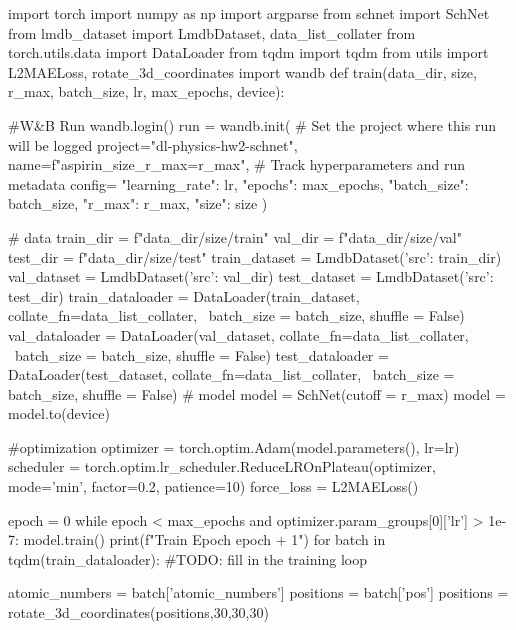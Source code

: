 import torch
import numpy as np
import argparse
from schnet import SchNet
from lmdb_dataset import LmdbDataset, data_list_collater
from torch.utils.data import DataLoader
from tqdm import tqdm
from utils import L2MAELoss, rotate_3d_coordinates
import wandb
def train(data_dir, size, r_max, batch_size, lr, max_epochs, device):

    #W&B Run
    wandb.login()
    run = wandb.init(
    # Set the project where this run will be logged
    project="dl-physics-hw2-schnet",
    name=f"aspirin_{size}_r_max={r_max}",
    # Track hyperparameters and run metadata
    config={
        "learning_rate": lr,
        "epochs": max_epochs,
        "batch_size": batch_size,
        "r_max": r_max,
        "size": size
    }
    )

    # data
    train_dir = f"{data_dir}/{size}/train"
    val_dir = f"{data_dir}/{size}/val"
    test_dir = f"{data_dir}/{size}/test"
    train_dataset = LmdbDataset({'src': train_dir})
    val_dataset = LmdbDataset({'src': val_dir})
    test_dataset = LmdbDataset({'src': test_dir})
    train_dataloader = DataLoader(train_dataset, collate_fn=data_list_collater, \
                                batch_size = batch_size, shuffle = False)
    val_dataloader = DataLoader(val_dataset, collate_fn=data_list_collater, \
                                batch_size = batch_size, shuffle = False)
    test_dataloader = DataLoader(test_dataset, collate_fn=data_list_collater, \
                                batch_size = batch_size, shuffle = False)
    # model
    model = SchNet(cutoff = r_max)
    model = model.to(device)

    #optimization
    optimizer = torch.optim.Adam(model.parameters(), lr=lr)
    scheduler = torch.optim.lr_scheduler.ReduceLROnPlateau(optimizer, mode='min', factor=0.2, patience=10)    
    force_loss = L2MAELoss()

    epoch = 0
    while epoch < max_epochs and optimizer.param_groups[0]['lr'] > 1e-7:
        model.train()
        print(f"Train Epoch {epoch + 1}")
        for batch in tqdm(train_dataloader):
            #TODO: fill in the training loop
            
            
            atomic_numbers = batch['atomic_numbers']
            positions = batch['pos']
            positions = rotate_3d_coordinates(positions,30,30,30)
            
